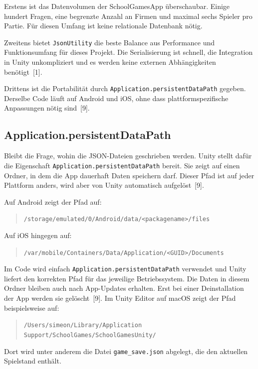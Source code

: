 \documentclass[12pt,a4paper]{article}
\begin{document}
Erstens ist das Datenvolumen der SchoolGamesApp überschaubar. Einige hundert Fragen, eine begrenzte Anzahl an Firmen und maximal sechs Spieler pro Partie. Für diesen Umfang ist keine relationale Datenbank nötig.

Zweitens bietet \texttt{JsonUtility} die beste Balance aus Performance und Funktionsumfang für dieses Projekt. Die Serialisierung ist schnell, die Integration in Unity unkompliziert und es werden keine externen Abhängigkeiten benötigt~[1].

Drittens ist die Portabilität durch \texttt{Application.persistentDataPath} gegeben. Derselbe Code läuft auf Android und iOS, ohne dass plattformspezifische Anpassungen nötig sind~[9].

\subsection{Application.persistentDataPath}

Bleibt die Frage, wohin die JSON-Dateien geschrieben werden. Unity stellt dafür die Eigenschaft \texttt{Application.persistentDataPath} bereit. Sie zeigt auf einen Ordner, in dem die App dauerhaft Daten speichern darf. Dieser Pfad ist auf jeder Plattform anders, wird aber von Unity automatisch aufgelöst~[9].

Auf Android zeigt der Pfad auf:

\begin{quote}
\small\texttt{/storage/emulated/0/Android/data/<packagename>/files}
\end{quote}

Auf iOS hingegen auf:

\begin{quote}
\small\texttt{/var/mobile/Containers/Data/Application/<GUID>/Documents}
\end{quote}

Im Code wird einfach \texttt{Application.persistentDataPath} verwendet und Unity liefert den korrekten Pfad für das jeweilige Betriebssystem. Die Daten in diesem Ordner bleiben auch nach App-Updates erhalten. Erst bei einer Deinstallation der App werden sie gelöscht~[9]. Im Unity Editor auf macOS zeigt der Pfad beispielsweise auf:

\begin{quote}
\small\texttt{/Users/simeon/Library/Application\allowbreak{} Support/\allowbreak{}SchoolGames/\allowbreak{}SchoolGamesUnity/}
\end{quote}

Dort wird unter anderem die Datei \texttt{game\_save.json} abgelegt, die den aktuellen Spielstand enthält.
\end{document}

